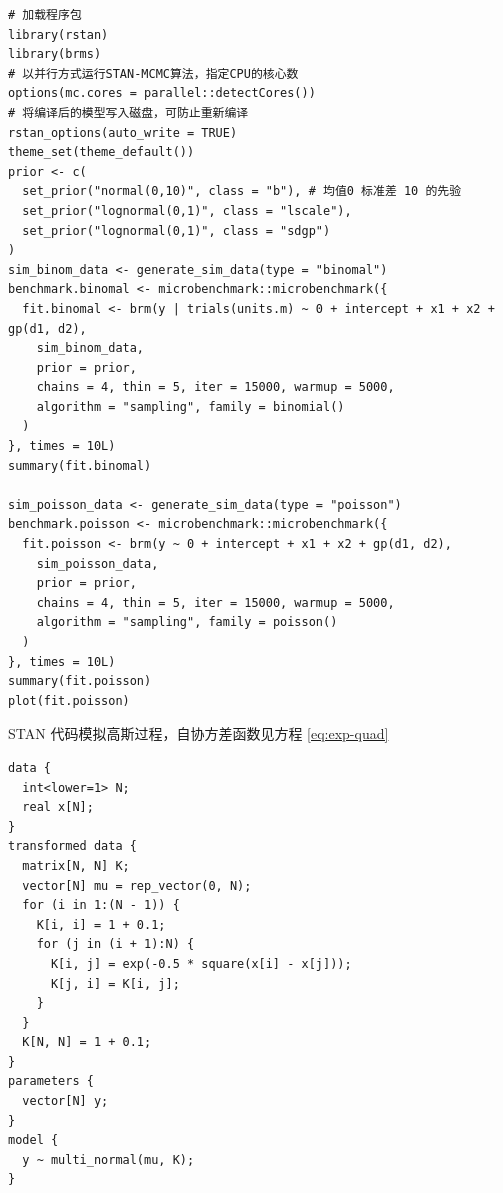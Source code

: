 \documentclass[12pt,a4paper,UTF8,twoside]{book}
\theoremstyle{definition}
\theoremstyle{definition}
\theoremstyle{definition}
\theoremstyle{remark}
\begin{document}
\begin{verbatim}
# 加载程序包
library(rstan)
library(brms)
# 以并行方式运行STAN-MCMC算法，指定CPU的核心数
options(mc.cores = parallel::detectCores())
# 将编译后的模型写入磁盘，可防止重新编译
rstan_options(auto_write = TRUE)
theme_set(theme_default())
prior <- c(
  set_prior("normal(0,10)", class = "b"), # 均值0 标准差 10 的先验
  set_prior("lognormal(0,1)", class = "lscale"),
  set_prior("lognormal(0,1)", class = "sdgp")
)
sim_binom_data <- generate_sim_data(type = "binomal")
benchmark.binomal <- microbenchmark::microbenchmark({
  fit.binomal <- brm(y | trials(units.m) ~ 0 + intercept + x1 + x2 + gp(d1, d2),
    sim_binom_data,
    prior = prior,
    chains = 4, thin = 5, iter = 15000, warmup = 5000,
    algorithm = "sampling", family = binomial()
  )
}, times = 10L)
summary(fit.binomal)

sim_poisson_data <- generate_sim_data(type = "poisson")
benchmark.poisson <- microbenchmark::microbenchmark({
  fit.poisson <- brm(y ~ 0 + intercept + x1 + x2 + gp(d1, d2),
    sim_poisson_data,
    prior = prior,
    chains = 4, thin = 5, iter = 15000, warmup = 5000, 
    algorithm = "sampling", family = poisson()
  )
}, times = 10L)
summary(fit.poisson)
plot(fit.poisson)
\end{verbatim}

STAN 代码模拟高斯过程，自协方差函数见方程 \ref{eq:exp-quad}

\begin{verbatim}
data {
  int<lower=1> N;
  real x[N];
}
transformed data {
  matrix[N, N] K;
  vector[N] mu = rep_vector(0, N);
  for (i in 1:(N - 1)) {
    K[i, i] = 1 + 0.1;
    for (j in (i + 1):N) {
      K[i, j] = exp(-0.5 * square(x[i] - x[j]));
      K[j, i] = K[i, j];
    }
  }
  K[N, N] = 1 + 0.1;
}
parameters {
  vector[N] y;
}
model {
  y ~ multi_normal(mu, K);
}
\end{verbatim}


\backmatter
\end{document}
